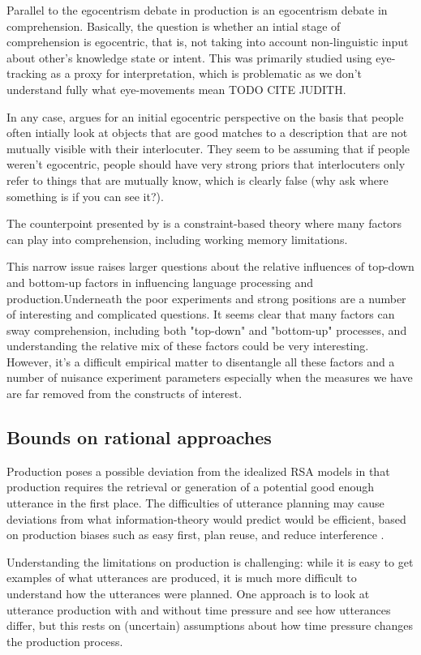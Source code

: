 \documentclass[]{article}
\begin{document}
Parallel to the egocentrism debate in production is an egocentrism debate in comprehension. Basically, the question is whether an intial stage of comprehension is egocentric, that is, not taking into account non-linguistic input about other's knowledge state or intent. This was primarily studied using eye-tracking as a proxy for interpretation, which is problematic as we don't understand fully what eye-movements mean TODO CITE JUDITH. 

In any case, \cite{keysar2000} argues for an initial egocentric perspective on the basis that people often intially look at objects that are good matches to a description that are not mutually visible with their interlocuter. They seem to be assuming that if people weren't egocentric, people should have very strong priors that interlocuters only refer to things that are mutually know, which is clearly false (why ask where something is if you can see it?). 

The counterpoint presented by \cite{hanna2003} is a constraint-based theory where many factors can play into comprehension, including working memory limitations. 

 This narrow issue raises larger questions about the relative influences of top-down and bottom-up factors in influencing language processing and production.Underneath the poor experiments and strong positions are a number of interesting and complicated questions. It seems clear that many factors can sway comprehension, including both "top-down" and "bottom-up" processes, and understanding the relative mix of these factors could be very interesting. However, it's a difficult empirical matter to disentangle all these factors and a number of nuisance experiment parameters especially when the measures we have are far removed from the constructs of interest. 

\subsection{Bounds on rational approaches}
Production poses a possible deviation from the idealized RSA models in that production requires the retrieval or generation of a potential good enough utterance in the first place. The difficulties of utterance planning may cause deviations from what information-theory would predict would be efficient, based on production biases such as easy first, plan reuse, and reduce interference \cite{macdonald2013}. 

Understanding the limitations on production is challenging: while it is easy to get examples of what utterances are produced, it is much more difficult to understand how the utterances were planned. One approach is to look at utterance production with and without time pressure and see how utterances differ, but this rests on (uncertain) assumptions about how time pressure changes the production process. 
\end{document}
